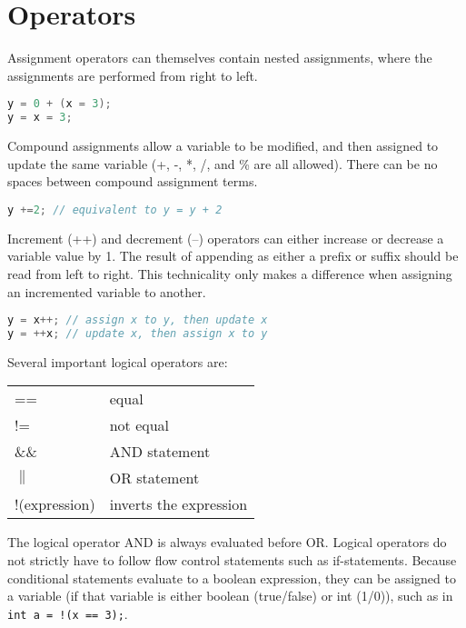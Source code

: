 \documentclass[10pt]{article}
\begin{document}
\section{Operators}

Assignment operators can themselves contain nested assignments, where the assignments are performed from right to left.

\begin{lstlisting}[language=C++]
y = 0 + (x = 3);
y = x = 3;
\end{lstlisting}

Compound assignments allow a variable to be modified, and then assigned to update the same variable (+, -, *, /, and \% are all allowed). There can be no spaces between compound assignment terms.

\begin{lstlisting}[language=C++]
y +=2; // equivalent to y = y + 2
\end{lstlisting}

Increment (++) and decrement (--) operators can either increase or decrease a variable value by 1. The result of appending as either a prefix or suffix should be read from left to right. This technicality only makes a difference when assigning an incremented variable to another.

\begin{lstlisting}[language=C++]
y = x++; // assign x to y, then update x
y = ++x; // update x, then assign x to y
\end{lstlisting}

Several important logical operators are:

\begin{center}
\begin{tabular}{l l}
== & equal\\
!= & not equal\\
\&\& & AND statement\\
\(\|\) & OR statement\\
!(expression) & inverts the expression\\
\end{tabular}
\end{center}

The logical operator AND is always evaluated before OR. Logical operators do not strictly have to follow flow control statements such as if-statements. Because conditional statements evaluate to a boolean expression, they can be assigned to a variable (if that variable is either boolean (true/false) or int (1/0)), such as in \texttt{int a = !(x == 3);}.
\end{document}
